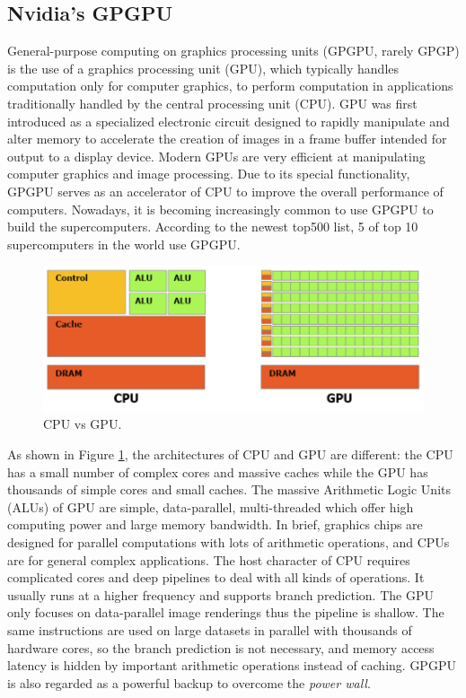 \subsection{Nvidia's GPGPU}

General-purpose computing on graphics processing units (GPGPU, rarely GPGP) is the use of a graphics processing unit (GPU), which typically handles computation only for computer graphics, to perform computation in applications traditionally handled by the central processing unit (CPU). GPU was first introduced as a specialized electronic circuit designed to rapidly manipulate and alter memory to accelerate the creation of images in a frame buffer intended for output to a display device. Modern GPUs are very efficient at manipulating computer graphics and image processing. Due to its special functionality, GPGPU serves as an accelerator of CPU to improve the overall performance of computers. Nowadays, it is becoming increasingly common to use GPGPU to build the supercomputers. According to the newest top500 list, 5 of top 10 supercomputers in the world use GPGPU.

\begin{figure}[htbp]
	\centering
	\includegraphics[width=6.in]{fig/cpu_vs_gpu.png}
	\caption{CPU vs GPU.}
	\label{cpuvsgpu}
\end{figure}

As shown in Figure \ref{cpuvsgpu}, the architectures of CPU and GPU are different: the CPU has a small number of complex cores and massive caches while the GPU has thousands of simple cores and small caches. The massive Arithmetic Logic Units (ALUs) of GPU are simple, data-parallel, multi-threaded which offer high computing power and large memory bandwidth. In brief, graphics chips are designed for parallel computations with lots of arithmetic operations, and CPUs are for general complex applications. The host character of CPU requires complicated cores and deep pipelines to deal with all kinds of operations. It usually runs at a higher frequency and supports branch prediction. The GPU only focuses on data-parallel image renderings thus the pipeline is shallow. The same instructions are used on large datasets in parallel with thousands of hardware cores, so the branch prediction is not necessary, and memory access latency is hidden by important arithmetic operations instead of caching. GPGPU is also regarded as a powerful backup to overcome the \textit{power wall}.

